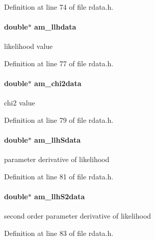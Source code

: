 Definition at line 74 of file rdata.\+h.

\hypertarget{struct_return_data_af95fa143e0e524652f9a818f6288b544}{}
\paragraph[{am\+\_\+llhdata}]{\setlength{\rightskip}{0pt plus 5cm}double$\ast$ am\+\_\+llhdata}\label{struct_return_data_af95fa143e0e524652f9a818f6288b544}
likelihood value 

Definition at line 77 of file rdata.\+h.

\hypertarget{struct_return_data_ae0fc05ce8c52bdda5c7bff541c79945d}{}
\paragraph[{am\+\_\+chi2data}]{\setlength{\rightskip}{0pt plus 5cm}double$\ast$ am\+\_\+chi2data}\label{struct_return_data_ae0fc05ce8c52bdda5c7bff541c79945d}
chi2 value 

Definition at line 79 of file rdata.\+h.

\hypertarget{struct_return_data_af72a5801bf4c6b957812c8b2471ecf41}{}
\paragraph[{am\+\_\+llh\+Sdata}]{\setlength{\rightskip}{0pt plus 5cm}double$\ast$ am\+\_\+llh\+Sdata}\label{struct_return_data_af72a5801bf4c6b957812c8b2471ecf41}
parameter derivative of likelihood 

Definition at line 81 of file rdata.\+h.

\hypertarget{struct_return_data_a9ea6527fa5408fa1ae074cdbd83ed11f}{}
\paragraph[{am\+\_\+llh\+S2data}]{\setlength{\rightskip}{0pt plus 5cm}double$\ast$ am\+\_\+llh\+S2data}\label{struct_return_data_a9ea6527fa5408fa1ae074cdbd83ed11f}
second order parameter derivative of likelihood 

Definition at line 83 of file rdata.\+h.

